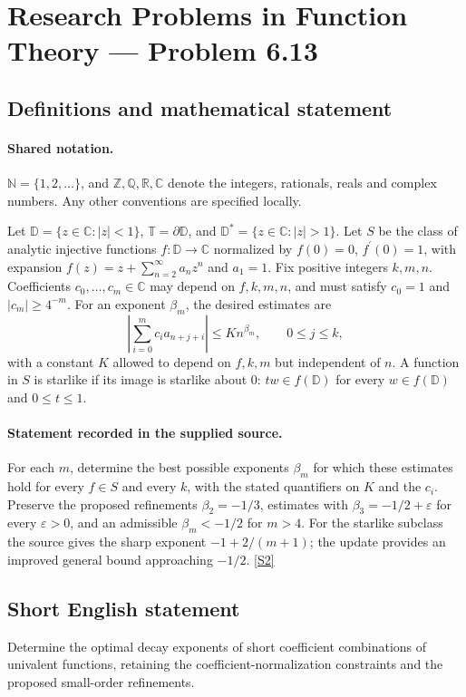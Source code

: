 \documentclass[11pt]{book}
\newcommand{\sref}[2]{\hyperlink{source:#1:#2}{[S#2]}}
\begin{document}
\section{Research Problems in Function Theory — Problem 6.13}\label{statement}

\subsection{Definitions and mathematical statement}

\paragraph{Shared notation.}$\mathbb N=\{1,2,\ldots\}$, and $\mathbb Z,\mathbb Q,\mathbb R,\mathbb C$ denote the integers, rationals, reals and complex numbers. Any other conventions are specified locally.


Let $\mathbb D=\{z\in\mathbb C:|z|<1\}$, $\mathbb T=\partial\mathbb D$, and $\mathbb D^*=\{z\in\mathbb C:|z|>1\}$. Let $S$ be the class of analytic injective functions $f:\mathbb D\to\mathbb C$ normalized by $f(0)=0$, $f^{\prime}(0)=1$, with expansion $f(z)=z+\sum_{n=2}^{\infty}a_nz^n$ and $a_1=1$. Fix positive integers $k,m,n$. Coefficients $c_0,\ldots,c_m\in\mathbb C$ may depend on $f,k,m,n$, and must satisfy $c_0=1$ and $|c_m|\ge4^{-m}$. For an exponent $\beta_m$, the desired estimates are \[\left|\sum_{i=0}^mc_i a_{n+j+i}\right|\le K n^{\beta_m},\qquad 0\le j\le k,\] with a constant $K$ allowed to depend on $f,k,m$ but independent of $n$. A function in $S$ is starlike if its image is starlike about $0$: $tw\in f(\mathbb D)$ for every $w\in f(\mathbb D)$ and $0\le t\le1$.
\paragraph{Statement recorded in the supplied source.}
For each $m$, determine the best possible exponents $\beta_m$ for which these estimates hold for every $f\in S$ and every $k$, with the stated quantifiers on $K$ and the $c_i$. Preserve the proposed refinements $\beta_2=-1/3$, estimates with $\beta_3=-1/2+\varepsilon$ for every $\varepsilon>0$, and an admissible $\beta_m<-1/2$ for $m>4$. For the starlike subclass the source gives the sharp exponent $-1+2/(m+1)$; the update provides an improved general bound approaching $-1/2$. \sref{statement}{2}
\subsection{Short English statement}
Determine the optimal decay exponents of short coefficient combinations of univalent functions, retaining the coefficient-normalization constraints and the proposed small-order refinements.
\end{document}
